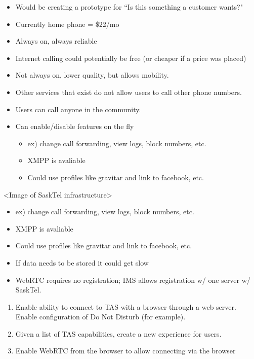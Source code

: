 \documentclass[12pt]{article}
\begin{document}
\begin{itemize}
\begin{itemize}
	\end{itemize}
	\item Would be creating a prototype for “Is this something a customer wants?"	
	\item Currently home phone = \$22/mo
	\item Always on, always reliable
	\item Internet calling could potentially be free (or cheaper if a price was placed)
	\item Not always on, lower quality, but allows mobility.
	\item Other services that exist do not allow users to call other phone numbers.
	\item Users can call anyone in the community.
	\item Can enable/disable features on the fly
	\begin{itemize}
		\item ex) change call forwarding, view logs, block numbers, etc.
		\item XMPP is avaliable
		\item Could use profiles like gravitar and link to facebook, etc.
	\end{itemize}
\end{itemize}

<Image of SaskTel infrastructure>

\begin{itemize}
	\item ex) change call forwarding, view logs, block numbers, etc.
	\item XMPP is avaliable
	\item Could use profiles like gravitar and link to facebook, etc.
	\item If data needs to be stored it could get slow
	\item WebRTC requires no registration; IMS allows registration w/ one server w/ SaskTel.
\end{itemize}

\begin{enumerate}
	\item Enable ability to connect to TAS with a browser through a web server. Enable configuration of Do Not Disturb (for example).
	\item Given a list of TAS capabilities, create a new experience for users.
	\item Enable WebRTC from the browser to allow connecting via the browser
\end{enumerate}
\end{document}
